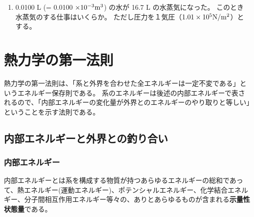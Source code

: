 \documentclass[uplatex,dvipdfmx,a4paper,11pt]{jsarticle}
\begin{document}
\begin{enumerate}
\begin{enumerate}
%
%
%

\item
0.0100 L (= 0.0100 $\times 10^{-3} {\rm m}^3$) の水が 16.7 L の水蒸気になった。
このとき水蒸気のする仕事はいくらか。
ただし圧力を１気圧（$1.01 \times 10^5 {\rm N}/{\rm m}^2$）とする。

%

\end{enumerate}


\end{enumerate}

\newpage


\section{熱力学の第一法則}
熱力学の第一法則は、「系と外界を合わせた全エネルギーは一定不変である」というエネルギー保存則である。
系のエネルギーは後述の内部エネルギーで表されるので、「内部エネルギーの変化量が外界とのエネルギーのやり取りと等しい」ということを示す法則である。

\subsection{内部エネルギーと外界との釣り合い}

\subsubsection{内部エネルギー}
内部エネルギーとは系を構成する物質が持つあらゆるエネルギーの総和であって、熱エネルギー(運動エネルギー)、ポテンシャルエネルギー、化学結合エネルギー、分子間相互作用エネルギー等々の、ありとあらゆるものが含まれる{\bf 示量性状態量}である。
\end{document}
